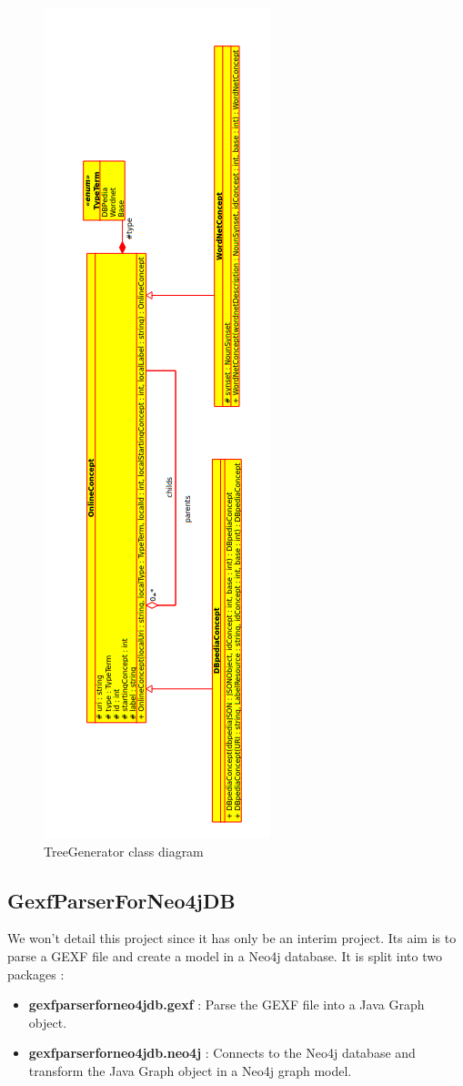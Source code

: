 \begin{figure}[h]
\begin{center}
\includegraphics[scale=0.6]{./Primitives/treeGeneratorModel.png}
\end{center}
\caption{TreeGenerator class diagram}
\label{fig:tg_model}
\end{figure}
\subsection{GexfParserForNeo4jDB} %
\label{sub:gexfparserforneo4jdb}
We won't detail this project since it has only be an interim project. Its aim is to parse a GEXF file and create a model in a Neo4j database. It is split into two packages :
\begin{itemize}
	\item \textbf{gexfparserforneo4jdb.gexf} : Parse the GEXF file into a Java Graph object.
	\item \textbf{gexfparserforneo4jdb.neo4j} : Connects to the Neo4j database and transform the Java Graph object in a Neo4j graph model. 
\end{itemize}
